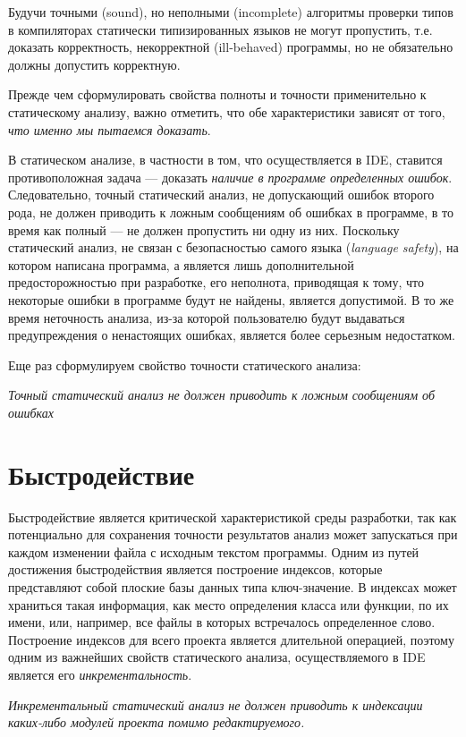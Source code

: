Будучи точными (sound), но неполными (incomplete) алгоритмы проверки типов в
компиляторах статически типизированных языков не могут пропустить, т.е. доказать
корректность, некорректной (ill-behaved) программы, но не обязательно должны
допустить корректную.

Прежде чем сформулировать свойства полноты и точности применительно к
статическому анализу, важно отметить, что обе характеристики зависят от того,
\emph{что именно мы пытаемся доказать}.

В статическом анализе, в частности в том, что осуществляется в IDE, ставится
противоположная задача --- доказать \emph{наличие в программе определенных
  ошибок}.  Следовательно, точный статический анализ, не допускающий ошибок
второго рода, не должен приводить к ложным сообщениям об ошибках в программе, в
то время как полный --- не должен пропустить ни одну из них. Поскольку
статический анализ, не связан с безопасностью самого языка (\emph{language
  safety}), на котором написана программа, а является лишь дополнительной
предосторожностью при разработке, его неполнота, приводящая к тому, что
некоторые ошибки в программе будут не найдены, является допустимой. В то же
время неточность анализа, из-за которой пользователю будут выдаваться
предупреждения о ненастоящих ошибках, является более серьезным недостатком.

Еще раз сформулируем свойство точности статического анализа:

\emph{Точный статический анализ не должен приводить к ложным сообщениям об 
ошибках}

\section{Быстродействие}

Быстродействие является критической характеристикой среды разработки, так как
потенциально для сохранения точности результатов анализ может запускаться при
каждом изменении файла с исходным текстом программы. Одним из путей достижения
быстродействия является построение индексов, которые представляют собой плоские
базы данных типа ключ-значение. В индексах может храниться такая информация, как
место определения класса или функции, по их имени, или, например, все файлы в
которых встречалось определенное слово. Построение индексов для всего проекта
является длительной операцией, поэтому одним из важнейших свойств статического
анализа, осуществляемого в IDE является его \emph{инкрементальность}.

\emph{Инкрементальный статический анализ не должен приводить к индексации 
 каких-либо модулей проекта помимо редактируемого.}

